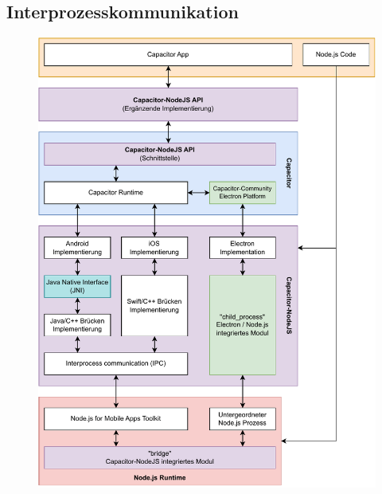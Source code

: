 \subsection{Interprozesskommunikation}

\begin{figure}[H]
    \centering
    \includegraphics[width=\textwidth]{assets/02_Capacitor-NodeJS/04_Aufbau+IPC.drawio.pdf}
\end{figure}


\clearpage
